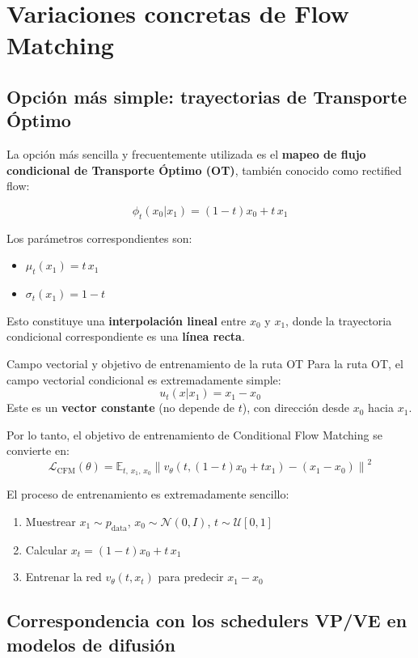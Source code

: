 \section{Variaciones concretas de Flow Matching}

\subsection{Opción más simple: trayectorias de Transporte Óptimo}

La opción más sencilla y frecuentemente utilizada es el \textbf{mapeo de flujo condicional de Transporte Óptimo (OT)}, también conocido como rectified flow:

$$\phi_t(x_0 | x_1) = (1 - t) x_0 + t \, x_1$$

Los parámetros correspondientes son:
\begin{itemize}
    \item $\mu_t(x_1) = t \, x_1$
    \item $\sigma_t(x_1) = 1 - t$
\end{itemize}

Esto constituye una \textbf{interpolación lineal} entre $x_0$ y $x_1$, donde la trayectoria condicional correspondiente es una \textbf{línea recta}.

\begin{importantbox}{Campo vectorial y objetivo de entrenamiento de la ruta OT}
Para la ruta OT, el campo vectorial condicional es extremadamente simple:
$$u_t(x | x_1) = x_1 - x_0$$
Este es un \textbf{vector constante} (no depende de $t$), con dirección desde $x_0$ hacia $x_1$.

Por lo tanto, el objetivo de entrenamiento de Conditional Flow Matching se convierte en:
$$\mathcal{L}_{\text{CFM}}(\theta) = \mathbb{E}_{t, \, x_1, \, x_0} \left\| v_\theta(t, (1-t)x_0 + t x_1) - (x_1 - x_0) \right\|^2$$

El proceso de entrenamiento es extremadamente sencillo:
\begin{enumerate}
    \item Muestrear $x_1 \sim p_{\text{data}}$, $x_0 \sim \mathcal{N}(0, I)$, $t \sim \mathcal{U}[0,1]$
    \item Calcular $x_t = (1-t)x_0 + t \, x_1$
    \item Entrenar la red $v_\theta(t, x_t)$ para predecir $x_1 - x_0$
\end{enumerate}
\end{importantbox}

\subsection{Correspondencia con los schedulers VP/VE en modelos de difusión}

